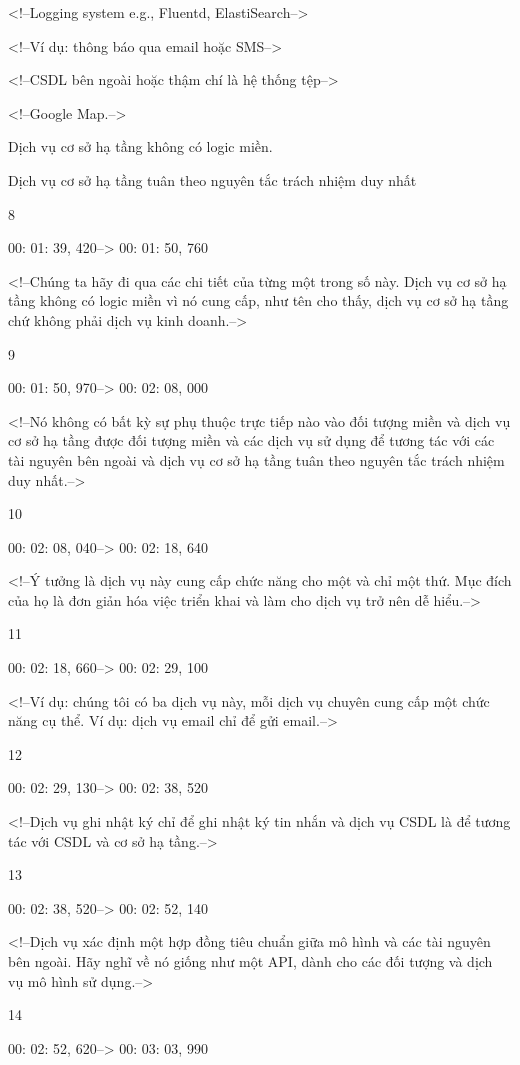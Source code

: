 <!--Logging system e.g., Fluentd, ElastiSearch-->

<!--Ví dụ: thông báo qua email hoặc SMS-->

<!--CSDL bên ngoài hoặc thậm chí là hệ thống tệp-->

<!--Google Map.-->

Dịch vụ cơ sở hạ tầng không có logic miền.

Dịch vụ cơ sở hạ tầng tuân theo nguyên tắc trách nhiệm duy nhất

8

00: 01: 39, 420--> 00: 01: 50, 760

<!--Chúng ta hãy đi qua các chi tiết của từng một trong số này. Dịch vụ cơ sở hạ tầng không có logic miền vì nó cung cấp, như tên cho thấy, dịch vụ cơ sở hạ tầng chứ không phải dịch vụ kinh doanh.-->

9

00: 01: 50, 970--> 00: 02: 08, 000

<!--Nó không có bất kỳ sự phụ thuộc trực tiếp nào vào đối tượng miền và dịch vụ cơ sở hạ tầng được đối tượng miền và các dịch vụ sử dụng để tương tác với các tài nguyên bên ngoài và dịch vụ cơ sở hạ tầng tuân theo nguyên tắc trách nhiệm duy nhất.-->

10

00: 02: 08, 040--> 00: 02: 18, 640

<!--Ý tưởng là dịch vụ này cung cấp chức năng cho một và chỉ một thứ. Mục đích của họ là đơn giản hóa việc triển khai và làm cho dịch vụ trở nên dễ hiểu.-->

11

00: 02: 18, 660--> 00: 02: 29, 100

<!--Ví dụ: chúng tôi có ba dịch vụ này, mỗi dịch vụ chuyên cung cấp một chức năng cụ thể. Ví dụ: dịch vụ email chỉ để gửi email.-->

12

00: 02: 29, 130--> 00: 02: 38, 520

<!--Dịch vụ ghi nhật ký chỉ để ghi nhật ký tin nhắn và dịch vụ CSDL là để tương tác với CSDL và cơ sở hạ tầng.-->

13

00: 02: 38, 520--> 00: 02: 52, 140

<!--Dịch vụ xác định một hợp đồng tiêu chuẩn giữa mô hình và các tài nguyên bên ngoài. Hãy nghĩ về nó giống như một API, dành cho các đối tượng và dịch vụ mô hình sử dụng.-->

14

00: 02: 52, 620--> 00: 03: 03, 990

